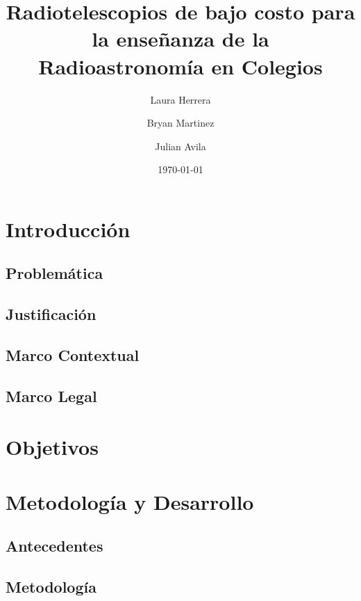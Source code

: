 \documentclass[sn-mathphys]{svmono}
\title{\Huge \textbf{Radiotelescopios de bajo costo para la enseñanza de la Radioastronomía en Colegios}}
\author{Laura Herrera \and Bryan Martinez \and Julian Avila}
\date{\today}
\begin{document}
\maketitle

\tableofcontents

\newpage

\chapter{Introducción}
\section{Problemática}


\section{Justificación}


\section{Marco Contextual}


\section{Marco Legal}


\chapter{Objetivos}


\chapter{Metodología y Desarrollo}

\section{Antecedentes}



\section{Metodología}


\end{document}
